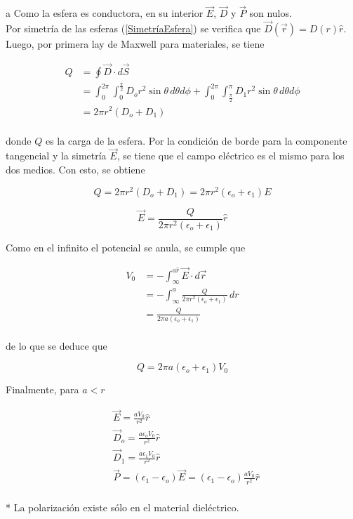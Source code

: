 \begin{solucion}{12}

\ics a
Como la esfera es conductora, en su interior $\Vec{E}$, $\Vec{D}$ y $\Vec{P}$ son nulos.\\

Por simetría de las esferas (\ref{SimetríaEsfera}) se verifica que $\Vec{D}(\Vec{r})=D(r)\hat{r}$. Luego, por primera lay de Maxwell para materiales, se tiene

\begin{equation}
\begin{split}
    Q &= \oint \Vec{D}\cdot d\Vec{S}\\
    &= \int^{2\pi}_0\int^{\frac{\pi}{2}}_0 D_or^2\sin{\theta}\,d\theta d\phi+\int^{2\pi}_0\int^\pi_{\frac{\pi}{2}} D_1r^2\sin{\theta}\,d\theta d\phi\\
    &= 2\pi r^2(D_o+D_1)\\
\end{split}
\nonumber
\end{equation}

donde $Q$ es la carga de la esfera. Por la condición de borde para la componente tangencial y la simetría $\Vec{E}$, se tiene que el campo eléctrico es el mismo para los dos medios. Con esto, se obtiene

\[Q = 2\pi r^2(D_o+D_1) = 2\pi r^2(\epsilon_o+\epsilon_1)E\]

\[\Vec{E}=\frac{Q}{2\pi r^2(\epsilon_o+\epsilon_1)}\hat{r}\]

Como en el infinito el potencial se anula, se cumple que

\begin{equation}
\begin{split}
    V_0 &= -\int^{a\hat{r}}_\infty\Vec{E}\cdot d\Vec{r}\\
    &= -\int^a_\infty\frac{Q}{2\pi r^2(\epsilon_o+\epsilon_1)}\,dr\\
    &= \frac{Q}{2\pi a(\epsilon_o+\epsilon_1)}\\
\end{split}
\nonumber
\end{equation}

de lo que se deduce que

\[Q = 2\pi a(\epsilon_o+\epsilon_1)V_0\]

Finalmente, para $a<r$

\begin{equation}
\begin{split}
    &\Vec{E} = \frac{aV_0}{r^2}\hat{r}\\
    &\Vec{D}_o = \frac{a\epsilon_o V_0}{r^2}\hat{r}\\
    &\Vec{D}_1 = \frac{a\epsilon_1 V_0}{r^2}\hat{r}\\
    &\Vec{P} = (\epsilon_1-\epsilon_o)\Vec{E}
    = (\epsilon_1-\epsilon_o)\frac{aV_0}{r^2}\hat{r}\\
\end{split}
\nonumber
\end{equation}

* La polarización existe sólo en el material dieléctrico.

\end{solucion}

